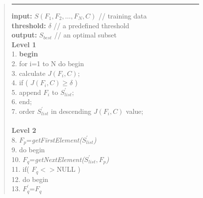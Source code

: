 \documentclass[a4paper,fleqn]{report}
\begin{document}
\begin{figure}[!h] \label{Fig:FCBF}
\begin{quote}
\hrule width 3.5 in
\vspace{0.5cm}
{\bf input:} \hspace{0.7cm}$S(F_{1},F_{2},\dots,F_{N},C)$ // training data \\ 
{\bf threshold: } $\delta $ \hspace{1.8cm}// a predefined threshold \\
{\bf output:} \hspace{0.5cm}$S_{best}$ \hspace{2.1cm}// an optimal subset \\
{\bf Level 1}
\\
1. \hspace{0.5cm}     {\bf begin} \\
2. \hspace{1.1cm}       for i=1 to N do begin \\
3. \hspace{1.3cm}         calculate $J(F_{i},C)$; \\
4. \hspace{1.3cm}         if ( $J(F_{i},C) \geq \delta $ ) \\
5. \hspace{1.6cm}            append $F_{i}$ to $S^{'}_{list}$; \\
6. \hspace{1.1cm}       end; \\
7. \hspace{1.1cm}       order $S^{'}_{list}$ in descending $J(F_{i},C)$ value; \\
\\
{\bf Level 2}
\\
8. \hspace{1.1cm}             $F_{p}$={\it getFirstElement($S^{'}_{list}$)}\\
9. \hspace{1.1cm}        do begin \\
10.\hspace{1.3cm}           $F_{q}$={\it getNextElement($S^{'}_{list},F_{p}$)} \\
11.\hspace{1.3cm}           if( $F_{q}<>$NULL ) \\
12.\hspace{1.6cm}                   do begin \\
13.\hspace{1.8cm}                       $F^{'}_{q}$=$F_{q}$ \\

\end{quote}
\end{figure}
\end{document}
